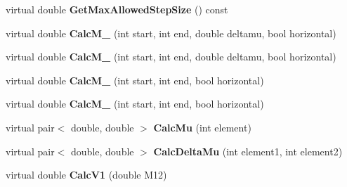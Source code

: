 \begin{DoxyCompactItemize}
\item 
\mbox{\label{classParticleTracking_1_1CCFailureProcess_a7f8667dc8441f0fe57df127700b79606}} 
virtual double {\bfseries Get\+Max\+Allowed\+Step\+Size} () const
\item 
\mbox{\label{classParticleTracking_1_1CCFailureProcess_adc086c1b44548ee89004c64b4a7d9e18}} 
virtual double {\bfseries Calc\+M\+\_} (int start, int end, double deltamu, bool horizontal)
\item 
\mbox{\label{classParticleTracking_1_1CCFailureProcess_af94d94452a58b029a4a916e475c1e5e2}} 
virtual double {\bfseries Calc\+M\+\_} (int start, int end, double deltamu, bool horizontal)
\item 
\mbox{\label{classParticleTracking_1_1CCFailureProcess_a2bb5e086e48d9f47d88a4f5d7357470d}} 
virtual double {\bfseries Calc\+M\+\_} (int start, int end, bool horizontal)
\item 
\mbox{\label{classParticleTracking_1_1CCFailureProcess_aefd15e7f80af1811e19e8e813279c31a}} 
virtual double {\bfseries Calc\+M\+\_} (int start, int end, bool horizontal)
\item 
\mbox{\label{classParticleTracking_1_1CCFailureProcess_acf1f4eb29fed5c90248291eb554e60a1}} 
virtual pair$<$ double, double $>$ {\bfseries Calc\+Mu} (int element)
\item 
\mbox{\label{classParticleTracking_1_1CCFailureProcess_aecf310c2335ed1b0ced8e24025ad55bf}} 
virtual pair$<$ double, double $>$ {\bfseries Calc\+Delta\+Mu} (int element1, int element2)
\item 
\mbox{\label{classParticleTracking_1_1CCFailureProcess_acdf305adc230d6c2fd19e5d503151bc5}} 
virtual double {\bfseries Calc\+V1} (double M12)
\item 
\mbox{\label{classParticleTracking_1_1CCFailureProcess_a4531684518c8196140b868e80bbf7973}} 

\end{DoxyCompactItemize}
